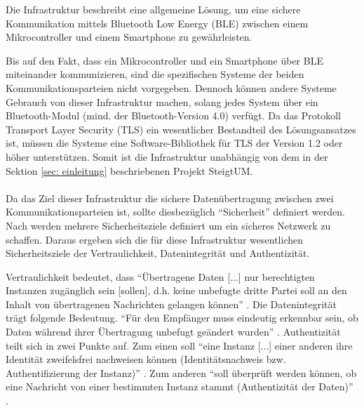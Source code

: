 Die Infrastruktur beschreibt eine allgemeine Lösung, um eine sichere Kommunikation mittels Bluetooth Low Energy (BLE) zwischen einem Mikrocontroller und einem Smartphone zu gewährleisten. 

Bis auf den Fakt, dass ein Mikrocontroller und ein Smartphone über BLE miteinander kommunizieren, sind die spezifischen Systeme der beiden Kommunikationsparteien nicht vorgegeben. Dennoch können andere Systeme Gebrauch von dieser Infrastruktur machen, solang jedes System über ein Bluetooth-Modul (mind. der Bluetooth-Version 4.0) verfügt. Da das Protokoll Transport Layer Security (TLS) ein wesentlicher Bestandteil des Lösungsansatzes ist, müssen die Systeme eine Software-Bibliothek für TLS der Version 1.2 oder höher unterstützen. Somit ist die Infrastruktur unabhängig von dem in der Sektion \ref{sec: einleitung} beschriebenen Projekt SteigtUM.
\\\\
Da das Ziel dieser Infrastruktur die sichere Datenübertragung zwischen zwei Kommunikationsparteien ist, sollte diesbezüglich "`Sicherheit"' definiert werden. Nach \cite{Bless2005_19-20} werden mehrere Sicherheitsziele definiert um ein sicheres Netzwerk zu schaffen. Daraus ergeben sich die für diese Infrastruktur wesentlichen Sicherheitsziele der Vertraulichkeit, Datenintegrität und Authentizität.

Vertraulichkeit bedeutet, dass "`Übertragene Daten [...] nur berechtigten Instanzen zugänglich sein [sollen], d.h. keine unbefugte dritte Partei soll an den Inhalt von übertragenen Nachrichten gelangen können"' \cite{Bless2005_19}.
Die Datenintegrität trägt folgende Bedeutung. "`Für den Empfänger muss eindeutig erkennbar sein, ob Daten während ihrer Übertragung unbefugt geändert wurden"' \cite{Bless2005_19}.
Authentizität teilt sich in zwei Punkte auf. Zum einen soll "`eine Instanz [...] einer anderen ihre Identität zweifelsfrei nachweisen können (Identitätsnachweis bzw. Authentifizierung der Instanz)"' \cite{Bless2005_19}. 
Zum anderen "`soll überprüft werden können, ob eine Nachricht von einer bestimmten Instanz stammt (Authentizität der Daten)"' \cite{Bless2005_19}.
